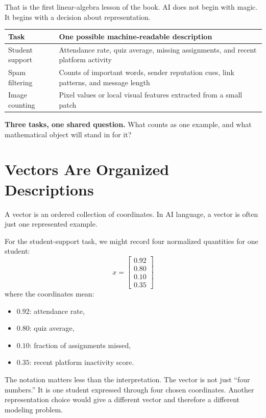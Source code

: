 That is the first linear-algebra lesson of the book. AI does not begin with magic. It begins with a decision about representation.

\begin{center}
\small
\begin{tabular}{p{2.33cm}p{7.62cm}}
\toprule
Task & One possible machine-readable description \\
\midrule
Student support & Attendance rate, quiz average, missing assignments, and recent platform activity \\
Spam filtering & Counts of important words, sender reputation cues, link patterns, and message length \\
Image counting & Pixel values or local visual features extracted from a small patch \\
\bottomrule
\end{tabular}

\medskip
\noindent\textbf{Three tasks, one shared question.} What counts as one example, and what mathematical object will stand in for it?
\end{center}

\section*{Vectors Are Organized Descriptions}

A vector is an ordered collection of coordinates. In AI language, a vector is often just one represented example.

For the student-support task, we might record four normalized quantities for one student:
\[
x =
\begin{bmatrix}
0.92 \\
0.80 \\
0.10 \\
0.35
\end{bmatrix}
\]
where the coordinates mean:
\begin{itemize}[leftmargin=*]
\item \(0.92\): attendance rate,
\item \(0.80\): quiz average,
\item \(0.10\): fraction of assignments missed,
\item \(0.35\): recent platform inactivity score.
\end{itemize}

The notation matters less than the interpretation. The vector is not just ``four numbers.'' It is one student expressed through four chosen coordinates. Another representation choice would give a different vector and therefore a different modeling problem.

